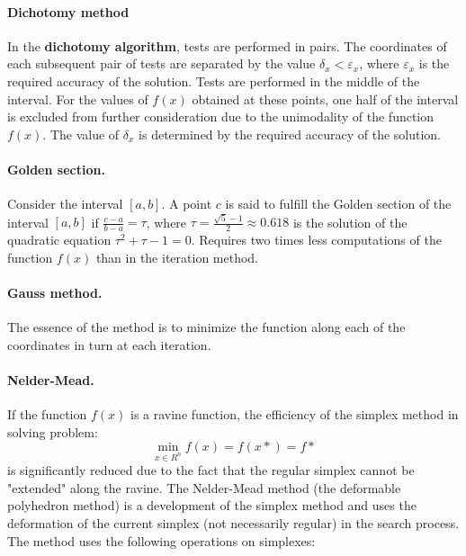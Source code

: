 \paragraph{Dichotomy method}

In the \textbf{dichotomy algorithm}, tests are performed in pairs.
The coordinates of each subsequent pair of tests are separated by the value $\delta_x < \varepsilon_x$, where $\varepsilon_x$ is the required accuracy of the solution.
Tests are performed in the middle of the interval.
For the values of $f(x)$ obtained at these points, one half of the interval is excluded from further consideration due to the unimodality of the function $f(x)$.
The value of $\delta_x$ is determined by the required accuracy of the solution.

\paragraph{Golden section.}

Consider the interval $[a, b]$.
A point $c$ is said to fulfill the Golden section of the interval $[a, b]$ if $\frac{c - a}{b - a} = \tau$, where $\tau = \frac{\sqrt{5} - 1}{2} \approx 0.618$ is the solution of the quadratic equation $\tau^2 + \tau - 1 = 0$.
Requires two times less computations of the function $f(x)$ than in the iteration method.

\paragraph{Gauss method.}

The essence of the method is to minimize the function along each of the coordinates in turn at each iteration.

\paragraph{Nelder-Mead.}

If the function $f(x)$ is a ravine function, the efficiency of the simplex method in solving problem:
\begin{equation}
    \min_{x \in R^n} f(x) = f(x*) = f*
\end{equation}
is significantly reduced due to the fact that the regular simplex cannot be "extended" along the ravine.
The Nelder-Mead method (the deformable polyhedron method) is a development of the simplex method and uses the deformation of the current simplex (not necessarily regular) in the search process.
The method uses the following operations on simplexes:

